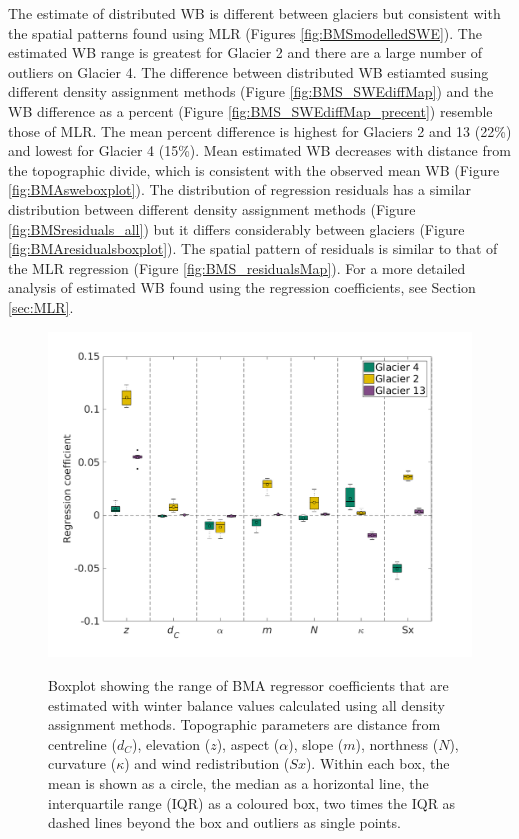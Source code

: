 \documentclass{sfuthesis}
\newcommand{\params}{Topographic parameters are distance from centreline ($d_C$), elevation ($z$), aspect ($\alpha$), slope ($m$), northness ($N$), curvature ($\kappa$) and wind redistribution ($Sx$). }
\newcommand{\boxplot}{Within each box, the mean is shown as a circle, the median as a horizontal line, the interquartile range (IQR) as a coloured box, two times the IQR as dashed lines beyond the box and outliers as single points. }
\begin{document}
The estimate of distributed WB is different between glaciers but consistent with the spatial patterns found using MLR (Figures \ref{fig:BMSmodelledSWE}). The estimated WB range is greatest for Glacier 2 and there are a large number of outliers on Glacier 4. The difference between distributed WB estiamted susing different density assignment methods (Figure \ref{fig:BMS_SWEdiffMap}) and the WB difference as a percent (Figure \ref{fig:BMS_SWEdiffMap_precent}) resemble those of MLR. The mean percent difference is highest for Glaciers 2 and 13 (22\%) and lowest for Glacier 4 (15\%). Mean estimated WB decreases with distance from the topographic divide, which is consistent with the observed mean WB (Figure \ref{fig:BMAsweboxplot}). The distribution of regression residuals has a similar distribution between different density assignment methods (Figure \ref{fig:BMSresiduals_all}) but it differs considerably between glaciers (Figure \ref{fig:BMAresidualsboxplot}). The spatial pattern of residuals is similar to that of the MLR regression (Figure \ref{fig:BMS_residualsMap}). For a more detailed analysis of estimated WB found using the regression coefficients, see Section \ref{sec:MLR}. 

\begin{figure}
	\centering
	\includegraphics[width =1.1 \textwidth]{BMScoeff_DensityOpts.png}\\
	\caption{Boxplot showing the range of BMA regressor coefficients that are estimated with winter balance values calculated using all density assignment methods. \params \boxplot }
	\label{fig:BMAcoeff_densityOptions}
\end{figure}
\end{document}
